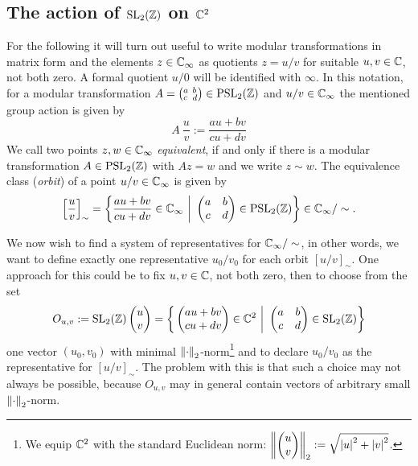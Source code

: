 \subsection{The action of $\SL{\Z}$ on $\C^2$}

For the following it will turn out useful to write modular transformations in matrix form and the elements $z \in \EC$ as quotients $z = u/v$ for suitable $u,v \in \C$, not both zero. A formal quotient $u/0$ will be identified with $\infty$. In this notation, for a modular transformation $A = \smallmat{a}{b}{c}{d} \in \PSL{\Z}$ and $u/v \in \EC$ the mentioned group action is given by
\begin{equation}
\label{eqn_ModGrpAction}
A \ \frac{u}{v} := \frac{a u + b v}{c u + d v}
\end{equation}
We call two points $z, w \in \EC$ \emph{equivalent}, if and only if there is a modular transformation $A \in \PSL{\Z}$ with $A z = w$ and we write  $z \sim w$. The equivalence class (\emph{orbit}) of a point $u/v \in \EC$ is given by 
\begin{equation*}
\left[\frac{u}{v}\right]_\sim = 
\setdefsz{\bigg}{\frac{a u + b v}{c u + d v} \in \EC}{\mat{a}{b}{c}{d} \in \PSL{\Z}} \in \EC / \sim.
\end{equation*}

We now wish to find a system of representatives for $\EC/\sim$, in other words, we want to define exactly one representative $u_0/v_0$ for each orbit $[u/v]_\sim$. One approach for this could be to fix $u,v \in \C$, not both zero, then to choose from the set
\begin{equation}
\label{eqn_FunDomOuv}
O_{u,v} := \SL{\Z} \cvec{u}{v} = \setdefsz{\bigg}{\cvec{a u + b v}{c u + d v} \in \C^2}{\mat{a}{b}{c}{d} \in \SL{\Z}}
\end{equation}
one vector $(u_0, v_0)$ with minimal $\eucnorm{\cdot}$-norm\footnote{We equip $\C^2$ with the standard Euclidean norm: $\eucnorm{\cvec{u}{v}} := \sqrt{\abs{u}^2 + \abs{v}^2}$.} and to declare $u_0/v_0$ as the representative for $[u/v]_\sim$. The problem with this is that such a choice may not always be possible, because $O_{u,v}$ may in general contain vectors of arbitrary small $\eucnorm{\cdot}$-norm. 

